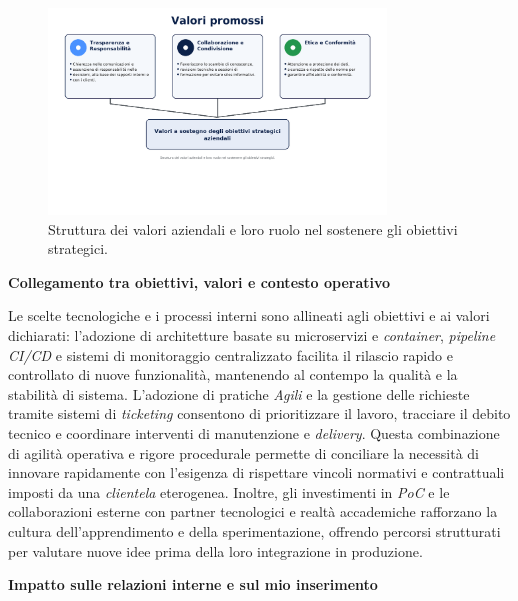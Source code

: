 \begin{figure}[htbp]
    \centering
    \includegraphics[width=0.8\textwidth]{images/azienda/valori_promossi}
    \caption{Struttura dei valori aziendali e loro ruolo nel sostenere gli obiettivi strategici.}
    \label{fig:valori}
\end{figure}


\medskip
\noindent\textbf{Collegamento tra obiettivi, valori e contesto operativo}

Le scelte tecnologiche e i processi interni sono allineati agli obiettivi e ai valori dichiarati: l'adozione di architetture basate su microservizi e \emph{container},
\emph{pipeline} \emph{CI/CD} e sistemi di monitoraggio centralizzato facilita il rilascio rapido e controllato di nuove funzionalità, mantenendo al contempo la qualità e la stabilità di sistema.
L'adozione di pratiche \emph{Agili} e la gestione delle richieste tramite sistemi di \emph{ticketing} consentono di prioritizzare il lavoro, tracciare il debito tecnico e coordinare interventi
di manutenzione e \emph{delivery}. Questa combinazione di agilità operativa e rigore procedurale permette di conciliare la necessità di innovare rapidamente con l'esigenza di rispettare
vincoli normativi e contrattuali imposti da una \emph{clientela} eterogenea. Inoltre, gli investimenti in \emph{PoC} e le collaborazioni esterne con partner tecnologici e realtà accademiche
rafforzano la cultura dell'apprendimento e della sperimentazione, offrendo percorsi strutturati per valutare nuove idee prima della loro integrazione in produzione.

\medskip
\noindent\textbf{Impatto sulle relazioni interne e sul mio inserimento}

